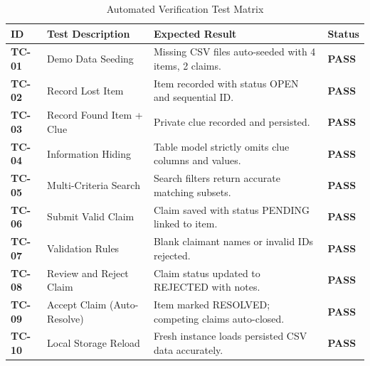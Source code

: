 \documentclass[11pt,a4paper]{article}
\begin{document}
\begin{table}[H]
    \centering
    \caption{Automated Verification Test Matrix}
    \label{tab:testcases}
    \begin{tabularx}{\textwidth}{lp{4cm}Xl}
        \toprule
        \textbf{ID} & \textbf{Test Description} & \textbf{Expected Result} & \textbf{Status} \\
        \midrule
        \textbf{TC-01} & Demo Data Seeding & Missing CSV files auto-seeded with 4 items, 2 claims. & \textbf{PASS} \\
        \textbf{TC-02} & Record Lost Item & Item recorded with status OPEN and sequential ID. & \textbf{PASS} \\
        \textbf{TC-03} & Record Found Item + Clue & Private clue recorded and persisted. & \textbf{PASS} \\
        \textbf{TC-04} & Information Hiding & Table model strictly omits clue columns and values. & \textbf{PASS} \\
        \textbf{TC-05} & Multi-Criteria Search & Search filters return accurate matching subsets. & \textbf{PASS} \\
        \textbf{TC-06} & Submit Valid Claim & Claim saved with status PENDING linked to item. & \textbf{PASS} \\
        \textbf{TC-07} & Validation Rules & Blank claimant names or invalid IDs rejected. & \textbf{PASS} \\
        \textbf{TC-08} & Review and Reject Claim & Claim status updated to REJECTED with notes. & \textbf{PASS} \\
        \textbf{TC-09} & Accept Claim (Auto-Resolve) & Item marked RESOLVED; competing claims auto-closed. & \textbf{PASS} \\
        \textbf{TC-10} & Local Storage Reload & Fresh instance loads persisted CSV data accurately. & \textbf{PASS} \\
        \bottomrule
    \end{tabularx}
\end{table}

\end{document}
